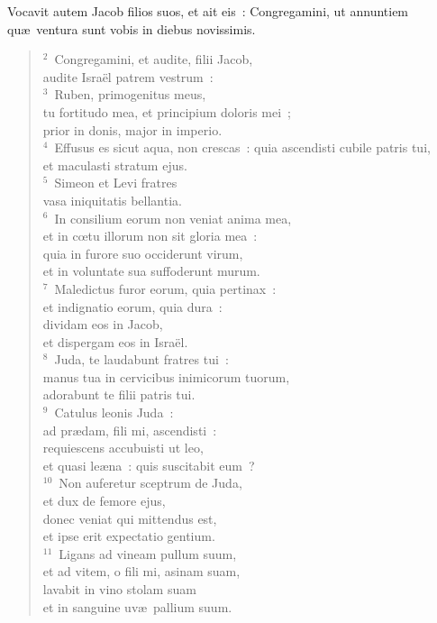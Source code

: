 \lettrine[lines=3,image=true,loversize=0.05,lraise=-0.03]{V}{}ocavit autem Jacob filios suos, et ait eis~: Congregamini, ut annuntiem qu\ae\ ventura sunt vobis in diebus novissimis.
\begin{flushleft}\begin{verse}\vspace{6pt}${}^{2}$~Congregamini, et audite, filii Jacob,\\ audite Isra\"el patrem vestrum~:\\
${}^{3}$~Ruben, primogenitus meus,\\ tu fortitudo mea, et principium doloris mei~;\\ prior in donis, major in imperio.\\
${}^{4}$~Effusus es sicut aqua, non crescas~: quia ascendisti cubile patris tui,\\ et maculasti stratum ejus.\\
${}^{5}$~Simeon et Levi fratres\\ vasa iniquitatis bellantia.\\
${}^{6}$~In consilium eorum non veniat anima mea,\\ et in cœtu illorum non sit gloria mea~:\\ quia in furore suo occiderunt virum,\\ et in voluntate sua suffoderunt murum.\\
${}^{7}$~Maledictus furor eorum, quia pertinax~:\\ et indignatio eorum, quia dura~:\\ dividam eos in Jacob,\\ et dispergam eos in Isra\"el.\\
${}^{8}$~Juda, te laudabunt fratres tui~:\\ manus tua in cervicibus inimicorum tuorum,\\ adorabunt te filii patris tui.\\
${}^{9}$~Catulus leonis Juda~:\\ ad pr\ae dam, fili mi, ascendisti~:\\ requiescens accubuisti ut leo,\\ et quasi le\ae na~: quis suscitabit eum~?\\
${}^{10}$~Non auferetur sceptrum de Juda,\\ et dux de femore ejus,\\ donec veniat qui mittendus est,\\ et ipse erit expectatio gentium.\\
${}^{11}$~Ligans ad vineam pullum suum,\\ et ad vitem, o fili mi, asinam suam,\\ lavabit in vino stolam suam\\ et in sanguine uv\ae\ pallium suum.\\

\end{verse}
\end{flushleft}
